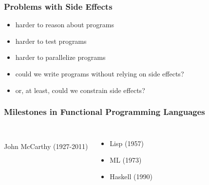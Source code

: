 \documentclass[dvipsnames]{beamer}
\theoremstyle{plain}
\begin{document}
\begin{frame}
  \frametitle{Problems with Side Effects}

  \begin{itemize}
    \item harder to reason about programs
    \item harder to test programs
    \item harder to parallelize programs

    \pause
    \bigskip
    \item could we write programs without relying on side effects?
    \item or, at least, could we constrain side effects?
  \end{itemize}
\end{frame}

\begin{frame}
  \frametitle{Milestones in Functional Programming Languages}

  \begin{columns}
    \begin{center}
      \\
      John McCarthy (1927-2011)
    \end{center}

    \begin{itemize}
      \item Lisp (1957)
      \item ML (1973)
      \item Haskell (1990)
    \end{itemize}
  \end{columns}
\end{frame}
\end{document}
